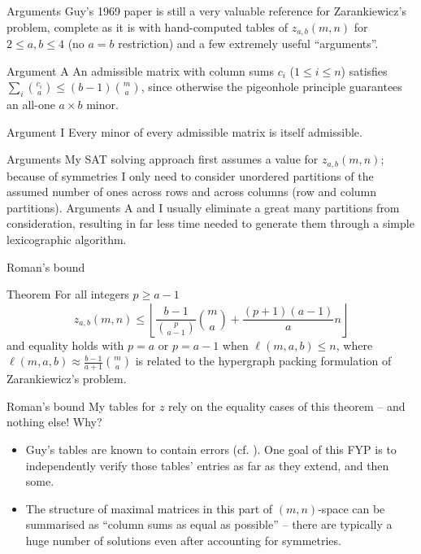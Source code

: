 \documentclass[10pt]{beamer}
\begin{document}
\begin{frame}{Arguments}
  Guy's 1969 paper \cite{guy} is still a very valuable reference for Zarankiewicz's problem, complete as it is with hand-computed tables of $z_{a,b}(m,n)$ for $2\le a,b\le4$ (no $a=b$ restriction) and a few extremely useful ``arguments''.
  \begin{block}{Argument A}
    An admissible matrix with column sums $c_i$ ($1\le i\le n$) satisfies $\sum_i\binom{c_i}a\le(b-1)\binom ma$, since otherwise the pigeonhole principle guarantees an all-one $a\times b$ minor.
  \end{block}
  \begin{block}{Argument I}
    Every minor of every admissible matrix is itself admissible.
  \end{block}
\end{frame}

\begin{frame}{Arguments}
    My SAT solving approach first assumes a value for $z_{a,b}(m,n)$; because of symmetries I only need to consider unordered partitions of the assumed number of ones across rows and across columns (row and column partitions). Arguments A and I usually eliminate a great many partitions from consideration, resulting in far less time needed to generate them through a simple lexicographic algorithm.
\end{frame}

\begin{frame}{Roman's bound}
  \begin{block}{Theorem \cite{roman}}
    For all integers $p\ge a-1$
		\begin{equation*}
			z_{a,b}(m,n)\le\left\lfloor\frac{b-1}{\binom p{a-1}}\binom ma+\frac{(p+1)(a-1)}an\right\rfloor
		\end{equation*}
		and equality holds with $p=a$ or $p=a-1$ when $\ell(m,a,b)\le n$, where $\ell(m,a,b)\approx\frac{b-1}{a+1}\binom ma$ is related to the hypergraph packing formulation of Zarankiewicz's problem.
  \end{block}
\end{frame}

\begin{frame}{Roman's bound}
  My tables for $z$ rely on the equality cases of this theorem -- and nothing else! Why?
  \begin{itemize}
      \item Guy's tables are known to contain errors (cf. \cite{heger}). One goal of this FYP is to independently verify those tables' entries as far as they extend, and then some.
      \item The structure of maximal matrices in this part of $(m,n)$-space can be summarised as ``column sums as equal as possible'' -- there are typically a huge number of solutions even after accounting for symmetries.
  \end{itemize}
\end{frame}
\end{document}
